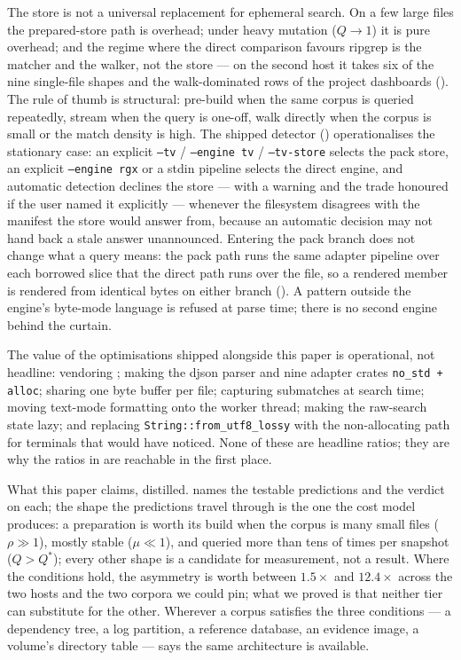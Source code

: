 \documentclass[11pt,letterpaper]{article}
\begin{document}
The store is not a universal replacement for ephemeral search. On a few
large files the prepared-store path is overhead; under heavy mutation
($Q\to 1$) it is pure overhead; and the regime where the direct comparison
favours ripgrep is the matcher and the walker, not the store --- on the
second host it takes six of the nine single-file shapes and the
walk-dominated rows of the project dashboards ().
The rule of thumb is structural: pre-build when the same corpus is queried
repeatedly, stream when the query is one-off, walk directly when the
corpus is small or the match density is high. The shipped detector
() operationalises the stationary case: an explicit
\texttt{--tv} / \texttt{--engine tv} / \texttt{--tv-store} selects the
pack store, an explicit \texttt{--engine rgx} or a stdin pipeline selects
the direct engine, and automatic detection declines the store --- with a
warning and the trade honoured if the user named it explicitly ---
whenever the filesystem disagrees with the manifest the store would
answer from, because an automatic decision may not hand back a stale
answer unannounced. Entering the pack branch does not change what a
query means: the pack path runs the same adapter pipeline over each
borrowed slice that the direct path runs over the file, so a rendered
member is rendered from identical bytes on either branch
(). A pattern outside the engine's byte-mode
language is refused at parse time; there is no second engine behind the
curtain.

The value of the optimisations shipped alongside this paper is
operational, not headline: vendoring ; making the djson
parser and nine adapter crates \texttt{no\_std + alloc}; sharing one
byte buffer per file; capturing submatches at search time; moving
text-mode formatting onto the worker thread; making the raw-search state
lazy; and replacing \texttt{String::from\_utf8\_lossy} with the
non-allocating path for terminals that would have noticed. None of these
are headline ratios; they are why the ratios in  are
reachable in the first place.

What this paper claims, distilled.  names the
testable predictions and the verdict on each; the shape the predictions
travel through is the one the cost model produces: a preparation is
worth its build when the corpus is many small files
($\rho \gg 1$), mostly stable ($\mu \ll 1$), and queried more than tens
of times per snapshot ($Q > Q^{*}$); every other shape is a candidate
for measurement, not a result. Where the conditions hold, the asymmetry
is worth between $1.5\times$ and $12.4\times$ across the two hosts and
the two corpora we could pin; what we proved is that neither tier can
substitute for the other. Wherever a corpus satisfies the three
conditions --- a dependency tree, a log partition, a reference database,
an evidence image, a volume's directory table ---  says
the same architecture is available.
\end{document}
